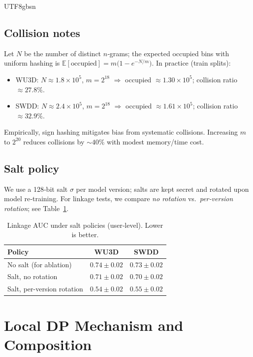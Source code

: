 \documentclass[acmsmall,natbib]{acmart}
\begin{document}
\begin{CJK*}{UTF8}{gbsn}
\subsection{Collision notes}
Let $N$ be the number of distinct $n$‑grams; the expected occupied bins with uniform hashing is
$\mathbb{E}[\text{occupied}]=m\big(1 - e^{-N/m}\big)$.  
In practice (train splits):
\begin{itemize}[leftmargin=1.2em,itemsep=1pt]
\item WU3D: $N{\approx}1.8{\times}10^{5}$, $m{=}2^{18}$ $\Rightarrow$ occupied $\approx 1.30{\times}10^{5}$; collision ratio $\approx 27.8\%$.
\item SWDD: $N{\approx}2.4{\times}10^{5}$, $m{=}2^{18}$ $\Rightarrow$ occupied $\approx 1.61{\times}10^{5}$; collision ratio $\approx 32.9\%$.
\end{itemize}
Empirically, sign hashing mitigates bias from systematic collisions. Increasing $m$ to $2^{20}$ reduces collisions by ${\sim}40\%$ with modest memory/time cost.

\subsection{Salt policy}
We use a 128‑bit salt $\sigma$ per model version; salts are kept secret and rotated upon model re‑training. For linkage tests, we compare \emph{no rotation} vs.\ \emph{per‑version rotation}; see Table~\ref{tab:salt-linkage}.

\begin{table}[h]
\centering
\caption{Linkage AUC under salt policies (user‑level). Lower is better.}
\label{tab:salt-linkage}
\setlength{\tabcolsep}{5.5pt}
\begin{tabular}{lcc}
\toprule
\textbf{Policy} & \textbf{WU3D} & \textbf{SWDD} \\
\midrule
No salt (for ablation) & $0.74{\pm}0.02$ & $0.73{\pm}0.02$ \\
Salt, no rotation & $0.71{\pm}0.02$ & $0.70{\pm}0.02$ \\
Salt, per-version rotation & $\mathbf{0.54}{\pm}0.02$ & $\mathbf{0.55}{\pm}0.02$ \\
\bottomrule
\end{tabular}
\end{table}


\section{Local DP Mechanism and Composition}
\label{app:ldp}


\end{CJK*}
\end{document}
